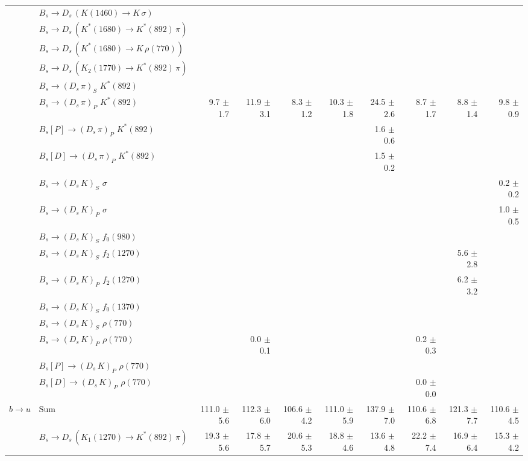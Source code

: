 \begin{tabular}{l l  r  r  r  r  r  r  r  r  }
 & $B_s \to D_s \, ( K(1460) \to K \, \sigma )$ &  &  &  &  &  &  &  &  \\ 
 & $B_s \to D_s \, ( K^{*}(1680) \to K^{*}(892) \, \pi )$ &  &  &  &  &  &  &  &  \\ 
 & $B_s \to D_s \, ( K^{*}(1680) \to K \, \rho(770) )$ &  &  &  &  &  &  &  &  \\ 
 & $B_s \to D_s \, ( K_2(1770) \to K^{*}(892) \, \pi )$ &  &  &  &  &  &  &  &  \\ 
 & $B_s \to ( D_s \, \pi)_{S} \, \, K^{*}(892)$ &  &  &  &  &  &  &  &  \\ 
 & $B_s \to ( D_s \, \pi)_{P} \, \, K^{*}(892)$ & 9.7 $\pm$ 1.7 & 11.9 $\pm$ 3.1 & 8.3 $\pm$ 1.2 & 10.3 $\pm$ 1.8 & 24.5 $\pm$ 2.6 & 8.7 $\pm$ 1.7 & 8.8 $\pm$ 1.4 & 9.8 $\pm$ 0.9 \\ 
 & $B_s[P] \to ( D_s \, \pi)_{P} \, \, K^{*}(892)$ &  &  &  &  & 1.6 $\pm$ 0.6 &  &  &  \\ 
 & $B_s[D] \to ( D_s \, \pi)_{P} \, \, K^{*}(892)$ &  &  &  &  & 1.5 $\pm$ 0.2 &  &  &  \\ 
 & $B_s \to ( D_s \, K)_{S} \, \, \sigma$ &  &  &  &  &  &  &  & 0.2 $\pm$ 0.2 \\ 
 & $B_s \to ( D_s \, K)_{P} \, \, \sigma$ &  &  &  &  &  &  &  & 1.0 $\pm$ 0.5 \\ 
 & $B_s \to ( D_s \, K)_{S} \, \, f_0(980)$ &  &  &  &  &  &  &  &  \\ 
 & $B_s \to ( D_s \, K)_{S} \, \, f_2(1270)$ &  &  &  &  &  &  & 5.6 $\pm$ 2.8 &  \\ 
 & $B_s \to ( D_s \, K)_{P} \, \, f_2(1270)$ &  &  &  &  &  &  & 6.2 $\pm$ 3.2 &  \\ 
 & $B_s \to ( D_s \, K)_{S} \, \, f_0(1370)$ &  &  &  &  &  &  &  &  \\ 
 & $B_s \to ( D_s \, K)_{S} \, \, \rho(770)$ &  &  &  &  &  &  &  &  \\ 
 & $B_s \to ( D_s \, K)_{P} \, \, \rho(770)$ &  & 0.0 $\pm$ 0.1 &  &  &  & 0.2 $\pm$ 0.3 &  &  \\ 
 & $B_s[P] \to ( D_s \, K)_{P} \, \, \rho(770)$ &  &  &  &  &  &  &  &  \\ 
 & $B_s[D] \to ( D_s \, K)_{P} \, \, \rho(770)$ &  &  &  &  &  & 0.0 $\pm$ 0.0 &  &  \\ 
\multirow{32}{*}{$b \to u$}  & $\text{Sum}$ & 111.0 $\pm$ 5.6 & 112.3 $\pm$ 6.0 & 106.6 $\pm$ 4.2 & 111.0 $\pm$ 5.9 & 137.9 $\pm$ 7.0 & 110.6 $\pm$ 6.8 & 121.3 $\pm$ 7.7 & 110.6 $\pm$ 4.5 \\ 
\hline
 & $B_s \to D_s \, ( K_1(1270) \to K^{*}(892) \, \pi )$ & 19.3 $\pm$ 5.6 & 17.8 $\pm$ 5.7 & 20.6 $\pm$ 5.3 & 18.8 $\pm$ 4.6 & 13.6 $\pm$ 4.8 & 22.2 $\pm$ 7.4 & 16.9 $\pm$ 6.4 & 15.3 $\pm$ 4.2 \\ 

\end{tabular}
